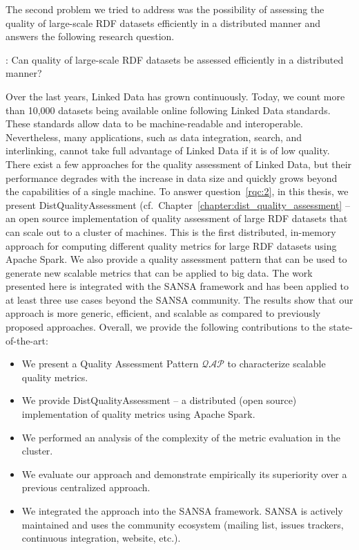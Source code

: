 The second problem we tried to address was the possibility of assessing the quality of large-scale \gls{RDF} datasets efficiently in a distributed manner and answers the following research question.

\begin{tcolorbox}
\textbf{\rqNr[RQ2]\label{rqc:2}}: Can quality of large-scale \gls{RDF} datasets be assessed efficiently in a distributed manner?
\end{tcolorbox}

Over the last years, Linked Data has grown continuously. 
Today, we count more than 10,000 datasets being available online following Linked Data standards. 
These standards allow data to be machine-readable and interoperable.  
Nevertheless, many applications, such as data integration, search, and interlinking, cannot take full advantage of Linked Data if it is of low quality.
There exist a few approaches for the quality assessment of Linked Data, but their performance degrades with the increase in data size and quickly grows beyond the capabilities of a single machine.
To answer question~\ref{rqc:2}, in this thesis, we present DistQualityAssessment (cf.\ Chapter~\ref{chapter:dist_quality_assessment} -- an open source implementation of quality assessment of large \gls{RDF} datasets that can scale out to a cluster of machines.
This is the first distributed, in-memory approach for computing different quality metrics for large \gls{RDF} datasets using Apache Spark. We also provide a quality assessment pattern that can be used to generate new scalable metrics that can be applied to big data.
The work presented here is integrated with the SANSA framework and has been applied to at least three use cases beyond the SANSA community.   
The results show that our approach is more generic, efficient, and scalable as compared to previously proposed approaches.
Overall, we provide the following contributions to the state-of-the-art:

\begin{itemize}
    \item We present a Quality Assessment Pattern $\mathcal{QAP}$ to characterize scalable quality metrics.
    \item We provide DistQualityAssessment -- a distributed (open source) implementation of quality metrics using Apache Spark.
    \item We performed an analysis of the complexity of the metric evaluation in the cluster.
    \item We evaluate our approach and demonstrate empirically its superiority over a previous centralized approach.
    \item We integrated the approach into the SANSA framework.
    SANSA is actively maintained and uses the community ecosystem (mailing list, issues trackers, continuous integration, website, etc.).
\end{itemize}

